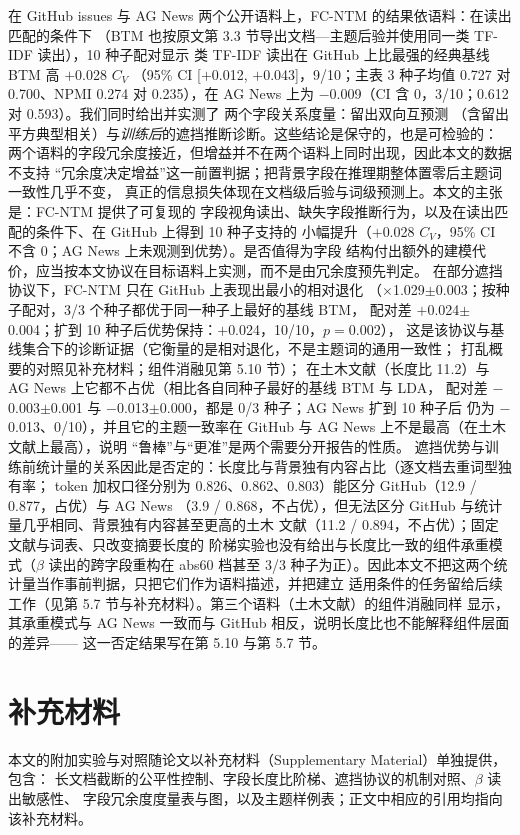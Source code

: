 \documentclass{article}
\begin{document}
在 GitHub issues 与 AG News 两个公开语料上，FC-NTM 的结果依语料：在读出匹配的条件下
（BTM 也按原文第 3.3 节导出文档—主题后验并使用同一类 TF-IDF 读出），10 种子配对显示
类 TF-IDF 读出在 GitHub 上比最强的经典基线 BTM 高 $+$0.028 $C_V$
（95\% CI [$+$0.012, $+$0.043]，9/10；主表 3 种子均值 0.727 对 0.700、NPMI 0.274 对
0.235），在 AG News 上为 $-$0.009（CI 含 0，3/10；0.612 对 0.593）。我们同时给出并实测了
两个字段关系度量：留出双向互预测
（含留出平方典型相关）与\emph{训练后}的遮挡推断诊断。这些结论是保守的，也是可检验的：
两个语料的字段冗余度接近，但增益并不在两个语料上同时出现，因此本文的数据不支持
“冗余度决定增益”这一前置判据；把背景字段在推理期整体置零后主题词一致性几乎不变，
真正的信息损失体现在文档级后验与词级预测上。本文的主张是：FC-NTM 提供了可复现的
字段视角读出、缺失字段推断行为，以及在读出匹配的条件下、在 GitHub 上得到 10 种子支持的
小幅提升（$+$0.028 $C_V$，95\% CI 不含 0；AG News 上未观测到优势）。是否值得为字段
结构付出额外的建模代价，应当按本文协议在目标语料上实测，而不是由冗余度预先判定。
在部分遮挡协议下，FC-NTM 只在 GitHub 上表现出最小的相对退化
（$\times$1.029$\pm$0.003；按种子配对，3/3 个种子都优于同一种子上最好的基线 BTM，
配对差 $+$0.024$\pm$0.004；扩到 10 种子后优势保持：$+$0.024，10/10，$p=0.002$），
这是该协议与基线集合下的诊断证据（它衡量的是相对退化，不是主题词的通用一致性；
打乱概要的对照见补充材料；组件消融见第 5.10 节）；
在土木文献（长度比 11.2）与 AG News 上它都不占优（相比各自同种子最好的基线 BTM 与 LDA，
配对差 $-$0.003$\pm$0.001 与 $-$0.013$\pm$0.000，都是 0/3 种子；AG News 扩到 10 种子后
仍为 $-$0.013、0/10），并且它的主题一致率在 GitHub 与 AG News 上不是最高（在土木文献上最高），说明
“鲁棒”与“更准”是两个需要分开报告的性质。
遮挡优势与训练前统计量的关系因此是否定的：长度比与背景独有内容占比（逐文档去重词型独有率；
token 加权口径分别为 0.826、0.862、0.803）能区分 GitHub（12.9 / 0.877，占优）与 AG News
（3.9 / 0.868，不占优），但无法区分 GitHub 与统计量几乎相同、背景独有内容甚至更高的土木
文献（11.2 / 0.894，不占优）；固定文献与词表、只改变摘要长度的
阶梯实验也没有给出与长度比一致的组件承重模式（$\beta$ 读出的跨字段重构在 abs60 档甚至
3/3 种子为正）。因此本文不把这两个统计量当作事前判据，只把它们作为语料描述，并把建立
适用条件的任务留给后续工作（见第 5.7 节与补充材料）。第三个语料（土木文献）的组件消融同样
显示，其承重模式与 AG News 一致而与 GitHub 相反，说明长度比也不能解释组件层面的差异——
这一否定结果写在第 5.10 与第 5.7 节。

\section*{补充材料}
本文的附加实验与对照随论文以补充材料（Supplementary Material）单独提供，包含：
长文档截断的公平性控制、字段长度比阶梯、遮挡协议的机制对照、$\beta$ 读出敏感性、
字段冗余度度量表与图，以及主题样例表；正文中相应的引用均指向该补充材料。
\end{document}
